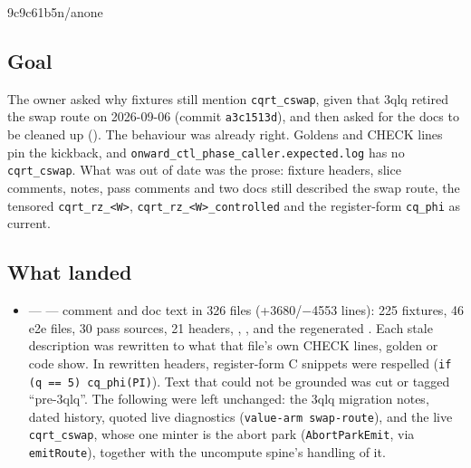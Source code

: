 %
  {9c9c61b5}{n/a}{none}

\subsection*{Goal}
The owner asked why fixtures still mention \texttt{cqrt\_cswap}, given that 3qlq retired the
swap route on 2026-09-06 (commit \texttt{a3c1513d}), and then asked for the docs to be
cleaned up (). The behaviour was already right. Goldens and
CHECK lines pin the kickback, and \texttt{onward\_ctl\_phase\_caller.expected.log} has no
\texttt{cqrt\_cswap}. What was out of date was the prose: fixture headers, slice
comments,  notes, pass comments and two docs still
described the swap route, the tensored \texttt{cqrt\_rz\_<W>}, \texttt{cqrt\_rz\_<W>\_controlled}
and the register-form \texttt{cq\_phi} as current.

\subsection*{What landed}
\begin{itemize}
  \item {} ---  --- comment and doc
  text in 326 files (+3680/$-$4553 lines): 225 fixtures, 46 e2e files, 30 pass sources,
  21 headers, , , and the
  regenerated . Each stale description was rewritten to what that
  file's own CHECK lines, golden or code show. In rewritten headers, register-form C
  snippets were respelled (\texttt{if (q == 5) cq\_phi(PI)}). Text that could not be
  grounded was cut or tagged ``pre-3qlq''. The following were left unchanged: the 3qlq
  migration notes, dated history, quoted live diagnostics (\texttt{value-arm swap-route}),
  and the live \texttt{cqrt\_cswap}, whose one minter is the abort park
  (\texttt{AbortParkEmit}, via \texttt{emitRoute}), together with the uncompute spine's
  handling of it.
\end{itemize}

